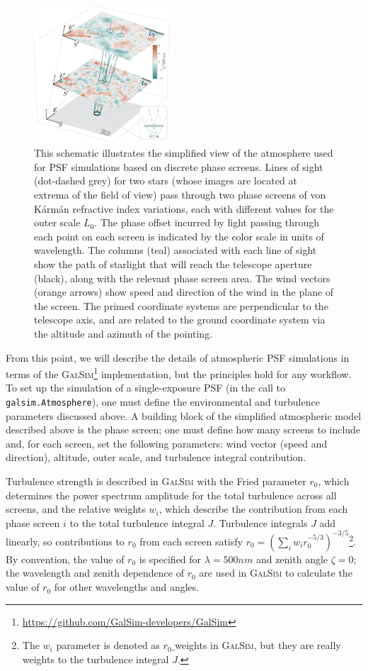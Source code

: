 \documentclass[twocolumn]{aastex631}
\newcommand{\galsim}{\textsc{GalSim}\xspace}
\newcommand{\vk}{von K\'arm\'an\xspace}
\begin{document}
\begin{figure}
\includegraphics[width=0.45\textwidth]{f1_sim_schematic.png}
\caption{
    This schematic illustrates the simplified view of the atmosphere used for PSF simulations based on discrete phase screens. 
    Lines of sight (dot-dashed grey) for two stars (whose images are located at extrema of the field of view) pass through two phase screens of \vk refractive index variations, each with different values for the outer scale $L_0$. 
    The phase offset incurred by light passing through each point on each screen is indicated by the color scale in units of wavelength.
    The columns (teal) associated with each line of sight show the path of starlight that will reach the telescope aperture (black), along with the relevant phase screen area. 
    The wind vectors (orange arrows) show speed and direction of the wind in the plane of the screen.
    The primed coordinate systems are perpendicular to the telescope axis, and are related to the ground coordinate system via the altitude and azimuth of the pointing.
    \label{fig:schematic}
    }
\end{figure}

From this point, we will describe the details of  atmospheric PSF simulations in terms of the \galsim\footnote{\url{https://github.com/GalSim-developers/GalSim}} \citep{rowe_galsim_2015} implementation, but the principles hold for any workflow.
To set up the simulation of a single-exposure PSF (in the call to \texttt{galsim.Atmosphere}), one must define the environmental and turbulence parameters discussed above.
A building block of the simplified atmospheric model described above is the phase screen; one must define how many screens to include and, for each screen, set the following parameters: wind vector (speed and direction), altitude, outer scale, and turbulence integral contribution.

Turbulence strength is described in \galsim with the Fried parameter $r_0$, which determines the power spectrum amplitude for the total turbulence across all screens, and the relative weights $w_i$, which describe the contribution from each phase screen $i$ to the total turbulence integral $J$.
Turbulence integrals $J$ add linearly, so contributions to $r_0$ from each screen satisfy $r_0 = (\sum_{i} w_i r_0^{-5/3})^{-3/5}$\footnote{The $w_i$ parameter is denoted as $r_{0}\_$weights in \galsim, but they are really weights to the turbulence integral $J$.}.
By convention, the value of $r_0$ is specified for $\lambda=500\unit{nm}$ and zenith angle $\zeta=0$; the wavelength and zenith dependence of $r_0$ are used in \galsim to calculate the value of $r_0$ for other wavelengths and angles.
\end{document}
